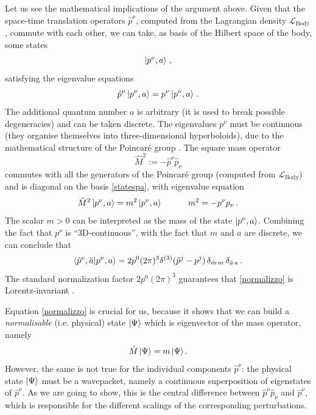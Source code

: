 \documentclass[twocolumn,usenatbib]{mnras2}
\newcommand{\spc}{\quad \quad \quad}
\begin{document}
Let us see the mathematical implications of the argument above. Given that the space-time translation operators $\hat{p}^\nu$, computed from the Lagrangian density $\mathcal{L}_{\text{Body}}$, commute with each other, we can take, as basis of the Hilbert space of the body, some states
\begin{equation}\label{statespa}
    \ket{p^\nu,a} \, ,
\end{equation}
satisfying the eigenvalue equations
\begin{equation}\label{eigenvalueequationpnu}
 \hat{p}^\nu \ket{p^\nu,a} = p^\nu \ket{p^\nu,a} \, .
\end{equation}
The additional quantum number $a$ is arbitrary (it is used to break possible degeneracies) and can be taken discrete. The eigenvalues $p^\nu$ must be continuous (they organise themselves into three-dimensional hyperboloids), due to the mathematical structure of the Poincar\'e group \citep{Weinberg_QFT_1995}. The square mass operator 
\begin{equation}
   \hat{M}^2 := -\hat{p}^\nu \hat{p}_\nu 
\end{equation}
commutes with all the generators of the Poincar\'e group (computed from $\mathcal{L}_{\text{Body}}$) and is diagonal on the basis \eqref{statespa}, with eigenvalue equation
\begin{equation}\label{autodimassa}
  \hat{M}^2  \ket{p^\nu,a} = m^2 \ket{p^\nu,a}  \spc m^2 =-p^\nu p_\nu \, .
\end{equation}
The scalar $m>0$ can be interpreted as the mass of the state $\ket{p^\nu,a}$. Combining the fact that $p^\nu$ is ``3D-continuous'', with the fact that $m$ and $a$ are discrete, we can conclude that  
\begin{equation}\label{normalizzo}
\braket{ \tilde{p}^\nu , \tilde{a}|p^\nu,a} = 2 p^0 (2\pi)^3 \delta^{(3)} (\tilde{p}^j - p^j) \, \delta_{\tilde{m} \, m}  \, \delta_{\tilde{a} \, a} \, .
\end{equation}
The standard normalization factor $2 p^0 (2\pi)^3$ guarantees that \eqref{normalizzo} is Lorentz-invariant \citep{Peskin_book}. 

Equation \eqref{normalizzo} is crucial for us, because it shows that we can build a \textit{normalisable} (i.e. physical) state $\ket{\Psi}$ which is eigenvector of the mass operator, namely
\begin{equation}\label{eigenf}
    \hat{M}\ket{\Psi} = m \ket{\Psi}.
\end{equation}
However, the same is not true for the individual components $\hat{p}^\nu$: the physical state $\ket{\Psi}$ must be a wavepacket, namely a continuous superposition of eigenstates of $\hat{p}^\nu$. As we are going to show, this is the central difference between $\hat{p}^\nu \hat{p}_\nu$ and $\hat{p}^\nu$, which is responsible for the different scalings of the corresponding perturbations.
\end{document}
